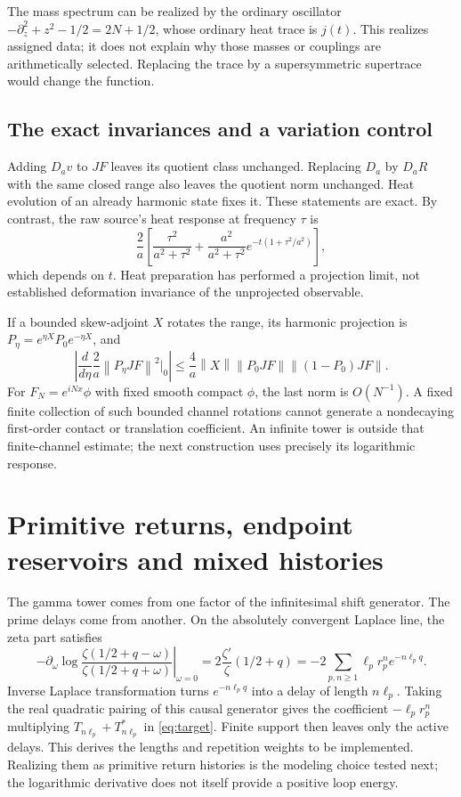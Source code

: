\documentclass[11pt]{article}
\numberwithin{equation}{section}
\theoremstyle{definition}
\theoremstyle{remark}
\newcommand{\norm}[1]{\left\lVert#1\right\rVert}
\begin{document}
The mass spectrum can be realized by the ordinary oscillator $-\partial_z^2+z^2-1/2=2N+1/2$, whose ordinary heat trace is $j(t)$. This realizes assigned data; it does not explain why those masses or couplings are arithmetically selected. Replacing the trace by a supersymmetric supertrace would change the function.

\subsection{The exact invariances and a variation control}
Adding $D_av$ to $JF$ leaves its quotient class unchanged. Replacing $D_a$ by $D_aR$ with the same closed range also leaves the quotient norm unchanged. Heat evolution of an already harmonic state fixes it. These statements are exact. By contrast, the raw source's heat response at frequency $\tau$ is
\begin{equation}
 \frac2a\left[\frac{\tau^2}{a^2+\tau^2}
 +\frac{a^2}{a^2+\tau^2}e^{-t(1+\tau^2/a^2)}\right],
\end{equation}
which depends on $t$. Heat preparation has performed a projection limit, not established deformation invariance of the unprojected observable.

If a bounded skew-adjoint $X$ rotates the range, its harmonic projection is $P_\eta=e^{\eta X}P_0e^{-\eta X}$, and
\begin{equation}
 \left|\frac d{d\eta}\frac2a\norm{P_\eta JF}^2\bigg|_{0}\right|
 \le\frac4a\norm X\norm{P_0JF}\norm{(1-P_0)JF}.
\end{equation}
For $F_N=e^{iNx}\phi$ with fixed smooth compact $\phi$, the last norm is $O(N^{-1})$. A fixed finite collection of such bounded channel rotations cannot generate a nondecaying first-order contact or translation coefficient. An infinite tower is outside that finite-channel estimate; the next construction uses precisely its logarithmic response.

\section{Primitive returns, endpoint reservoirs and mixed histories}
\label{sec:loops}
The gamma tower comes from one factor of the infinitesimal shift generator. The prime delays come from another. On the absolutely convergent Laplace line, the zeta part satisfies
\[
-\left.\partial_\omega\log
\frac{\zeta(1/2+q-\omega)}{\zeta(1/2+q+\omega)}
\right|_{\omega=0}
=2\frac{\zeta'}{\zeta}(1/2+q)
=-2\sum_{p,n\geq1}\ell_pr_p^n e^{-n\ell_p q}.
\]
Inverse Laplace transformation turns $e^{-n\ell_p q}$ into a delay of length $n\ell_p$. Taking the real quadratic pairing of this causal generator gives the coefficient $-\ell_pr_p^n$ multiplying $T_{n\ell_p}+T_{n\ell_p}^*$ in \eqref{eq:target}. Finite support then leaves only the active delays. This derives the lengths and repetition weights to be implemented. Realizing them as primitive return histories is the modeling choice tested next; the logarithmic derivative does not itself provide a positive loop energy.
\end{document}
